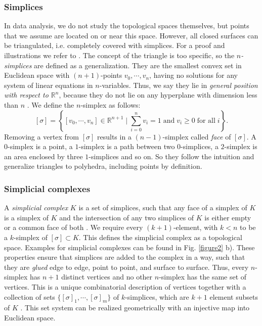 \documentclass[runningheads,orivec]{llncs}
\begin{document}
\subsubsection{Simplices} In data analysis, we do not study the topological spaces themselves, but points that we assume are located on or near this space. However, all closed surfaces can be triangulated, i.e. completely covered with simplices. For a proof and illustrations we refer to \cite[p.~102]{hatcher2002algebraic}\cite{lume}. The concept of the triangle is too specific, so the \emph{$n$-simplices} are defined as a generalization. They are the smallest convex set in Euclidean space with $(n+1)$-points $v_0,\cdots,v_n$, having no solutions for any system of linear equations in $n$-variables. Thus, we say they lie in \emph{general position with respect to $\mathbb{R}^n$}, because they do not lie on any hyperplane with dimension less than $n$ \cite[p.~103]{hatcher2002algebraic}. We define the $n$-simplex as follows:
\begin{equation}
    \label{simplex}
    [\sigma] = \left\{ [v_0,\cdots,v_n] \in \mathbb{R}^{n+1} \; \bigg\vert \; \sum_{i=0}^{n} v_i = 1 \; \text{and} \; v_i \geq 0 \; \text{for all} \; i \right\}.
\end{equation}
Removing a vertex from $[\sigma]$ results in a $(n-1)$-simplex called \emph{face} of $[\sigma]$. A $0$-simplex is a point, a $1$-simplex is a path between two $0$-simplices, a $2$-simplex is an area enclosed by three $1$-simplices and so on. So they follow the intuition and generalize triangles to polyhedra, including points by definition.


\subsubsection{Simplicial complexes} A \emph{simplicial complex} $K$ is a set of simplices, such that any face of a simplex of $K$ is a simplex of $K$ and the intersection of any two simplices of $K$ is either empty or a common face of both \cite[p.~11]{boissonnat2018geometric}. We require every $(k+1)$-element, with $k < n$ to be a $k$-simplex of $[\sigma] \subset K$. This defines the simplicial complex as a topological space. Examples for simplicial complexes can be found in Fig. \ref{figure2} b). These properties ensure that simplices are added to the complex in a way, such that they are \emph{glued} edge to edge, point to point, and surface to surface. Thus, every $n$-simplex has $n+1$ distinct vertices and no other $n$-simplex has the same set of vertices. This is a unique combinatorial description of vertices together with a collection of sets $\{[\sigma]_1, \cdots, [\sigma]_m\}$ of $k$-simplices, which are $k+1$ element subsets of $K$ \cite[p.~107]{hatcher2002algebraic}. This set system can be realized geometrically with an injective map into Euclidean space.
\end{document}

